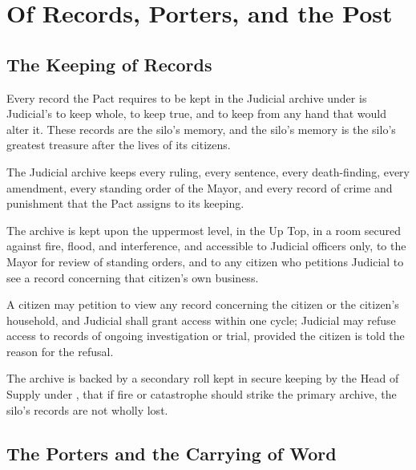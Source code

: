\chapter{Of Records, Porters, and the Post}
\label{art:records}


\section{The Keeping of Records}
\label{sec:records:keeping-of-records}

Every record the Pact requires to be kept in the Judicial archive under  is Judicial's to keep whole, to keep true, and to keep from any hand that would alter it. These records are the silo's memory, and the silo's memory is the silo's greatest treasure after the lives of its citizens.

\begin{clauses}
\item The Judicial archive keeps every ruling, every sentence, every death-finding, every amendment, every standing order of the Mayor, and every record of crime and punishment that the Pact assigns to its keeping.
\item The archive is kept upon the uppermost level, in the Up Top, in a room secured against fire, flood, and interference, and accessible to Judicial officers only, to the Mayor for review of standing orders, and to any citizen who petitions Judicial to see a record concerning that citizen's own business.
\item A citizen may petition to view any record concerning the citizen or the citizen's household, and Judicial shall grant access within one cycle; Judicial may refuse access to records of ongoing investigation or trial, provided the citizen is told the reason for the refusal.
\item The archive is backed by a secondary roll kept in secure keeping by the Head of Supply under , that if fire or catastrophe should strike the primary archive, the silo's records are not wholly lost.
\end{clauses}

\section{The Porters and the Carrying of Word}
\label{sec:records:porters-and-the-carrying-of-word}

